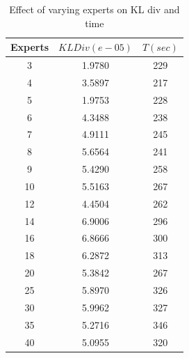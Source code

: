 \documentclass{sig-alternate}
\begin{document}
\begin{table}[htdp]
\begin{center}
\begin{tabular}{| c | c | c |}
\hline
Experts & $KL Div (e-05)$ & $T(sec)$\\
\hline
3 & 1.9780 & 229 \\
4 & 3.5897 & 217 \\
5 & 1.9753 & 228 \\
6 & 4.3488 & 238 \\
7 & 4.9111 & 245  \\
8 & 5.6564 & 241 \\
9 & 5.4290 & 258 \\
10 & 5.5163 & 267 \\
12 & 4.4504 & 262 \\
14 & 6.9006 & 296 \\
16 & 6.8666 & 300 \\
18 & 6.2872 & 313 \\
20 & 5.3842 & 267 \\
25 & 5.8970 & 326 \\
30 & 5.9962 & 327  \\
35 & 5.2716 & 346 \\
40 & 5.0955 & 320 \\
\hline
\end{tabular}
\end{center}
\caption{Effect of varying experts on KL div and time}
\label{table:error6}
\end{table}
\end{document}
